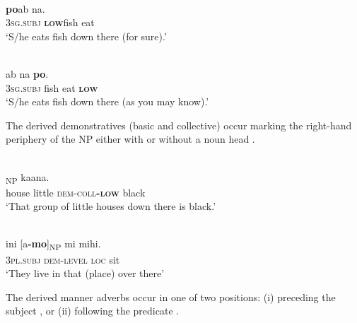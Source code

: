\documentclass[output=paper]{LSP/langsci}
\begin{document}
\ea%
\label{ex:7:13}
 \\
 \textbf{{po}}{ab}    {na.} \\
    \textsc{3sg.subj} \textbf{\textsc{low}}fish  eat\\
\glt  `S/he eats fish down there (for sure).'
\z

 

 
\ea%
\label{ex:7:14}
 \\
  ab    na \textbf{{po}}{.}\\
  \textsc{3sg.subj} fish  eat  \textbf{\textsc{low}}   \\
\glt   `S/he eats fish down there (as you may know).'
\z
 


  





The derived demonstratives (basic and collective) occur marking the right-hand periphery of the NP either with  or without a noun head .



\ea%
\label{ex:7:15}
 \\
\textsubscript{NP} ka{\textglotstop}ana.\\
    house  little  \textsc{dem-coll}\textbf{\textsc{-low}} black \\
\glt `That group of little houses down there is black.'
\z

  



  



\ea%
\label{ex:7:16}
 \\
\gll {\textglotstop}ini [{\textglotstop}{a}\textbf{-mo}]\textsubscript{NP} mi   {mihi.}\\
   \textsc{3pl.subj} \textsc{dem-level} \textsc{loc} sit \\
\glt `They live in that (place) over there'
\z

  

 

  

The derived manner adverbs occur in one of two positions: (i) preceding the subject , or (ii) following the predicate .
\end{document}
